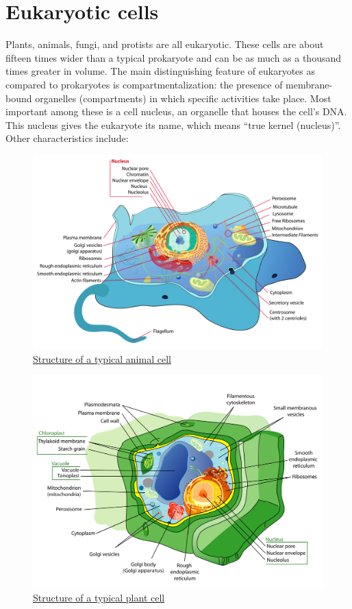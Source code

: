 \hypertarget{eukaryotic-cells}{%
\section{Eukaryotic cells}\label{eukaryotic-cells}}

Plants, animals, fungi, and protists are all eukaryotic. These cells are about fifteen times wider than a typical prokaryote and can be as much as a thousand times greater in volume. The main distinguishing feature of eukaryotes as compared to prokaryotes is compartmentalization: the presence of membrane-bound organelles (compartments) in which specific activities take place. Most important among these is a cell nucleus, an organelle that houses the cell's DNA. This nucleus gives the eukaryote its name, which means ``true kernel (nucleus)''. Other characteristics include:



\begin{figure}

{\centering \includegraphics[width=0.7\linewidth]{./figures/reproduction/Animal_cell_structure_en} 

}

\caption{\href{https://commons.wikimedia.org/wiki/File:Animal_cell_structure_en.svg}{Structure of a typical animal cell}}\label{fig:animalcell}
\end{figure}



\begin{figure}

{\centering \includegraphics[width=0.7\linewidth]{./figures/reproduction/Plant_cell_structure-en} 

}

\caption{\href{https://commons.wikimedia.org/wiki/File:Plant_cell_structure-en.svg}{Structure of a typical plant cell}}\label{fig:plantcell}
\end{figure}

